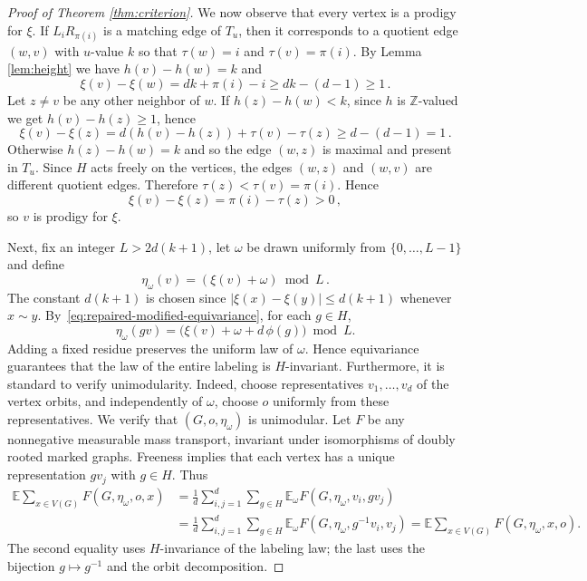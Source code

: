 \documentclass[11pt]{article}
\theoremstyle{remark}
\newcommand{\Z}{\mathbb Z}
\begin{document}
\begin{proof}[Proof of Theorem \ref{thm:criterion}]
We now observe that every vertex is a prodigy for $\xi$. If $L_i R_{\pi(i)}$ is a matching edge of $T_u$, then it corresponds to a quotient edge $(w,v)$ with $u$-value $k$ so that $\tau(w)=i$ and $\tau(v)=\pi(i)$. By Lemma \ref{lem:height} we have $h(v)-h(w)=k$ and
$$ \xi(v) - \xi(w) = dk + \pi(i) - i \geq dk - (d-1) \geq 1 \, .$$
Let $z \neq v$ be any other neighbor of $w$. If $h(z) - h(w) < k$, since $h$ is $\Z$-valued we get $h(v)-h(z) \geq 1$, hence
$$ \xi(v) - \xi(z) = d(h(v)-h(z)) + \tau(v) - \tau(z) \geq d - (d-1) = 1\, .$$
Otherwise $h(z)-h(w)=k$ and so the edge $(w,z)$ is maximal and present in $T_u$. Since $H$ acts freely on the vertices, the edges $(w,z)$ and $(w,v)$ are different quotient edges. Therefore $\tau(z) < \tau(v)=\pi(i)$. Hence
$$ \xi(v) - \xi(z) = \pi(i) - \tau(z) > 0 \, ,$$
so $v$ is prodigy for $\xi$. 

Next, fix an integer $L>2d(k+1)$, let $\omega$ be drawn uniformly from
$\{0,\ldots,L-1\}$ and define
$$ \eta_\omega(v)=(\xi(v)+\omega)\bmod L \, . $$
The constant $d(k+1)$ is chosen since $|\xi(x)-\xi(y)|\leq d(k+1)$ whenever $x \sim y$. By~\eqref{eq:repaired-modified-equivariance}, for each $g\in H$,
\[
  \eta_\omega(gv)
  =\bigl(\xi(v)+\omega+d\,\phi(g)\bigr)\bmod L.
\]
Adding a fixed residue preserves the uniform law of $\omega$. Hence equivariance guarantees that the law of the entire labeling is $H$-invariant. Furthermore, it is standard to verify unimodularity. Indeed, choose  representatives $v_1,\ldots,v_d$ of the vertex
 orbits, and independently of $\omega$, choose $o$ uniformly from
 these representatives. We verify that $(G,o,\eta_\omega)$ is
 unimodular. Let $F$
 be any nonnegative measurable mass transport, invariant under
 isomorphisms of doubly rooted marked graphs. Freeness implies that
 each vertex has a unique representation $gv_j$ with $g\in H$. Thus
 \begin{align*}
   \mathbb E\sum_{x\in V(G)}F(G, \eta_\omega, o,x)
  &=\frac1d\sum_{i,j=1}^d\sum_{g\in H}
    \mathbb E_\omega F(G, \eta_\omega,v_i,gv_j)\\
  &=\frac1d\sum_{i,j=1}^d\sum_{g\in H}
    \mathbb E_\omega F(G,\eta_\omega,g^{-1}v_i,v_j) =\mathbb E\sum_{x\in V(G)}F(G, \eta_\omega,x,o).
\end{align*}
The second equality uses $H$-invariance of the labeling law; the
last uses the bijection $g\mapsto g^{-1}$ and the orbit
decomposition. 




\end{proof}
\end{document}

